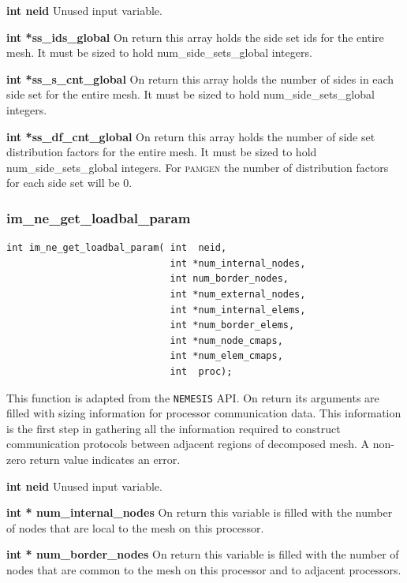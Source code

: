 {\setlength{\parindent}{0pt}
 \textbf{int neid} Unused input variable.}

{\setlength{\parindent}{0pt}
 \textbf{int *ss\_ids\_global} On return this array holds the side set ids for the entire mesh. It must be sized to hold num\_side\_sets\_global integers.}

{\setlength{\parindent}{0pt}
 \textbf{int *ss\_s\_cnt\_global} On return this array holds the number of sides in each side set for the entire mesh. It must be sized to hold num\_side\_sets\_global integers.}

{\setlength{\parindent}{0pt}
 \textbf{int *ss\_df\_cnt\_global} On return this array holds the number of side set distribution factors for the entire mesh. It must be sized to hold num\_side\_sets\_global integers. For \textsc{pamgen} the number of distribution factors for each side set will be 0.}

\subsubsection{im\_ne\_get\_loadbal\_param}
{\ttfamily  \begin{verbatim}
int im_ne_get_loadbal_param( int  neid,
                             int *num_internal_nodes,
                             int num_border_nodes,
                             int *num_external_nodes,
                             int *num_internal_elems,
                             int *num_border_elems,
                             int *num_node_cmaps,
                             int *num_elem_cmaps,
                             int  proc);
\end{verbatim}}
This function is adapted from the \texttt{NEMESIS} API. On return its arguments are filled with sizing information for  processor communication data. This information is the first step in gathering all the information required to construct communication protocols between adjacent regions of decomposed mesh. A non-zero return value indicates an error.

{\setlength{\parindent}{0pt}
 \textbf{int neid} Unused input variable.}

{\setlength{\parindent}{0pt}
 \textbf{int * num\_internal\_nodes} On return this variable is filled with the number of nodes that are local to the mesh on this processor.}

{\setlength{\parindent}{0pt}
 \textbf{int * num\_border\_nodes} On return this variable is filled with the number of nodes that are common to the mesh on this processor and to adjacent processors.}

